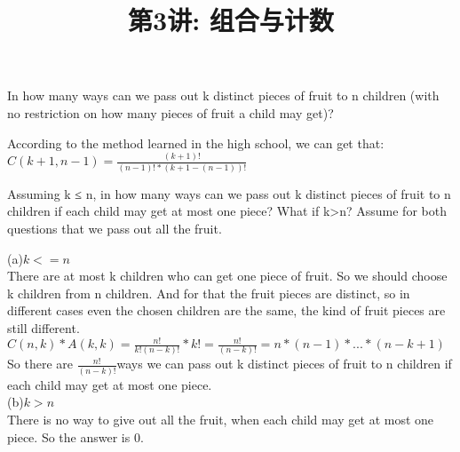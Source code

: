\documentclass[a4paper, justified]{tufte-handout}
\title{第3讲: 组合与计数}
\date{\zhtoday} %
\begin{document}
\maketitle
\noplagiarism %
\begin{abstract}
\end{abstract}
\beginrequired

\begin{problem}[CS 1.2-1]
In how many ways can we pass out k distinct pieces of fruit to n children (with no restriction on how many pieces of fruit a child may get)?
\end{problem}

\begin{solution}
  According to the method learned in the high school, we can get that:\\
  $C(k + 1, n - 1) = \frac{(k + 1)!}{(n - 1)! * (k + 1 - (n - 1))!}$
\end{solution}

\begin{problem}[CS 1.2-5]
Assuming k ≤ n, in how many ways can we pass out k distinct pieces of fruit to n children if each child may get at most one piece? What if k>n? Assume for both questions that we pass out all the fruit.
\end{problem}

\begin{solution}
  (a)$k <= n$\\
  There are at most k children who can get one piece of fruit. So we should choose k children from n children. And for that the fruit pieces are distinct, so in different cases even the chosen children are the same, the kind of fruit pieces are still different.\\
  $C(n, k) * A(k, k) = \frac{n!}{k!(n - k)!} * k! = \frac{n!}{(n - k)!} = n * (n - 1) * ... * (n - k + 1)$\\
  So there are $\frac{n!}{(n - k)!}$ways we can pass out k distinct pieces of fruit to n children if each child may get at most one piece.\\
  (b)$k > n$\\
  There is no way to give out all the fruit, when each child may get at most one piece. So the answer is 0.
\end{solution}
\end{document}
